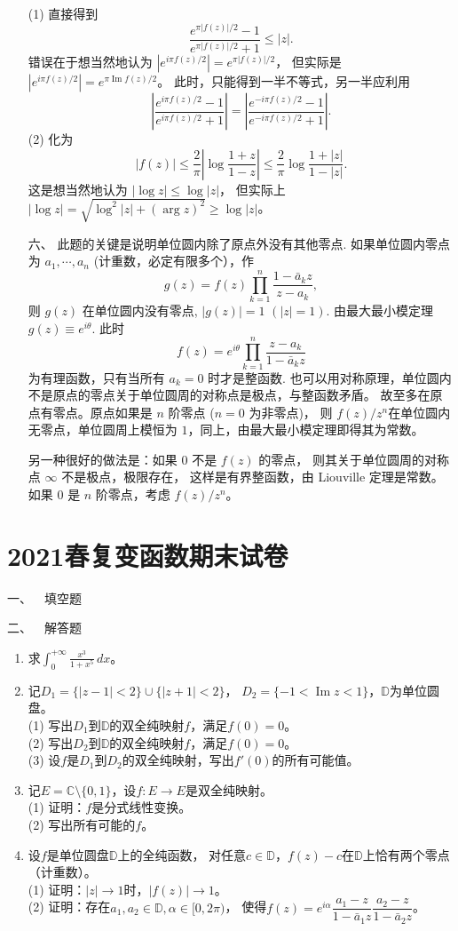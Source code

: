 \begin{itemize}
(1) 直接得到
$$\frac{e^{\pi|f(z)|/2}-1}{e^{\pi|f(z)|/2}+1} \leq|z|.$$
错误在于想当然地认为 $\left|e^{i \pi f(z) / 2}\right|=e^{\pi|f(z)| / 2}$，
但实际是 $\left|e^{i \pi f(z) / 2}\right|=e^{\pi \operatorname{Im} f(z) / 2}$。
此时，只能得到一半不等式，另一半应利用
$$\left|\frac{e^{i \pi f(z) / 2}-1}{e^{i \pi f(z) / 2}+1}\right|
=\left|\frac{e^{-i \pi f(z) / 2}-1}{e^{-i \pi f(z) / 2}+1}\right|.$$
(2) 化为
$$|f(z)| \leq \frac{2}{\pi}\left|\log \frac{1+z}{1-z}\right| 
\leq \frac{2}{\pi} \log \frac{1+|z|}{1-|z|}.$$
这是想当然地认为 $|\log z| \leq \log |z|$，
但实际上 $|\log z|=\sqrt{\log^{2}|z|+(\arg z)^{2}} \geq \log |z|$。

\item[六、]此题的关键是说明单位圆内除了原点外没有其他零点. 
如果单位圆内零点为 $a_{1}, \cdots, a_{n}$ (计重数，必定有限多个），作
$$g(z)=f(z) \prod_{k=1}^{n} \frac{1-\bar{a}_{k} z}{z-a_{k}},$$
则 $g(z)$ 在单位圆内没有零点, $|g(z)|=1$ $(|z|=1)$. 
由最大最小模定理 $g(z) \equiv e^{i \theta}$. 此时
$$f(z)=e^{i \theta} \prod_{k=1}^{n} \frac{z-a_{k}}{1-\bar{a}_{k} z}$$
为有理函数，只有当所有 $a_{k}=0$ 时才是整函数.
也可以用对称原理，单位圆内不是原点的零点关于单位圆周的对称点是极点，与整函数矛盾。
故至多在原点有零点。原点如果是 $n$ 阶零点 ($n=0$ 为非零点)，
则 $f(z) / z^{n}$在单位圆内无零点，单位圆周上模恒为 $1$，同上，由最大最小模定理即得其为常数。

另一种很好的做法是：如果 $0$ 不是 $f(z)$ 的零点，
则其关于单位圆周的对称点 $\infty$ 不是极点，极限存在，
这样是有界整函数，由 Liouville 定理是常数。
如果 $0$ 是 $n$ 阶零点，考虑 $f(z) / z^{n}$。
\end{itemize}

\section{2021春复变函数期末试卷}
一、\ \ 填空题

二、\ \ 解答题
\begin{enumerate}
    \item 求$\displaystyle\int_0^{+\infty}\frac{x^3}{1+x^5}\,dx$。
    \item 记$D_1=\{|z-1|<2\}\cup\{|z+1|<2\}$，
    $D_2=\{-1<\operatorname{Im}z<1\}$，$\mathbb{D}$为单位圆盘。\\
    (1) 写出$D_1$到$\mathbb{D}$的双全纯映射$f$，满足$f(0)=0$。\\
    (2) 写出$D_2$到$\mathbb{D}$的双全纯映射$f$，满足$f(0)=0$。\\
    (3) 设$f$是$D_1$到$D_2$的双全纯映射，写出$f'(0)$的所有可能值。
    \item 记$E=\mathbb{C}\setminus\{0,1\}$，设$f:E \to E$是双全纯映射。\\
    (1) 证明：$f$是分式线性变换。\\
    (2) 写出所有可能的$f$。
    \item 设$f$是单位圆盘$\mathbb{D}$上的全纯函数，
    对任意$c\in\mathbb{D}$，$f(z)-c$在$\mathbb{D}$上恰有两个零点（计重数）。\\
    (1) 证明：$|z|\to1$时，$|f(z)|\to1$。\\
    (2) 证明：存在$a_1,a_2\in\mathbb{D},\alpha\in[0,2\pi)$，
    使得$f(z)=e^{i\alpha}\dfrac{a_1-z}{1-\bar{a}_1z}\dfrac{a_2-z}{1-\bar{a}_2z}$。
\end{enumerate}

